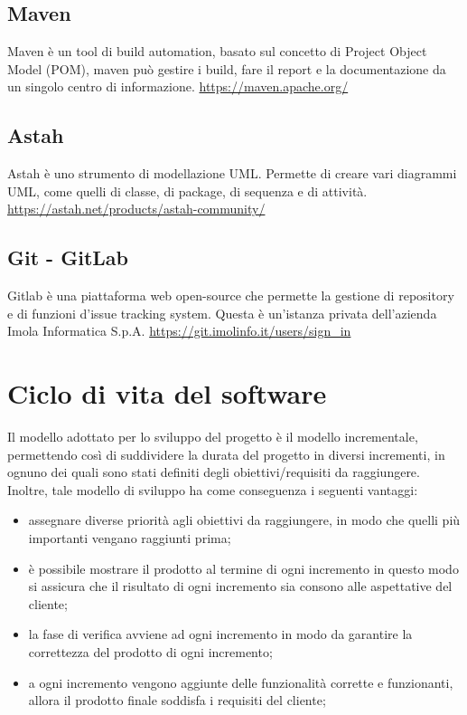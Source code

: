 \subsection*{Maven}
Maven è un tool di build automation, basato sul concetto di Project Object Model (POM), maven può gestire i build, fare il report e la documentazione da un singolo centro di informazione.
\url{https://maven.apache.org/}

\subsection*{Astah}
Astah è uno strumento di modellazione UML. Permette di creare vari diagrammi UML, come quelli di classe, di package, di sequenza e di attività.
\url{https://astah.net/products/astah-community/}

\subsection*{Git - GitLab}
Gitlab è una piattaforma web open-source che permette la gestione di repository e di funzioni d'issue tracking system.
Questa è un'istanza privata dell'azienda Imola Informatica S.p.A.
\url{https://git.imolinfo.it/users/sign_in}
\section{Ciclo di vita del software}\label{sec:ciclo-vita-software}
Il modello adottato per lo sviluppo del progetto è il modello incrementale, permettendo così di suddividere la durata del progetto in diversi incrementi, in ognuno dei quali sono stati definiti degli obiettivi/requisiti da raggiungere.
Inoltre, tale modello di sviluppo ha come conseguenza i seguenti vantaggi:
\begin{itemize}
    \item assegnare diverse priorità agli obiettivi da raggiungere, in modo che quelli più importanti vengano raggiunti prima;
    \item è possibile mostrare il prodotto al termine di ogni incremento in questo modo si assicura che il risultato di ogni incremento sia consono alle aspettative del cliente;
    \item la fase di verifica avviene ad ogni incremento in modo da garantire la correttezza del prodotto di ogni incremento;
    \item a ogni incremento vengono aggiunte delle funzionalità corrette e funzionanti, allora il prodotto finale soddisfa i requisiti del cliente;
\end{itemize}
